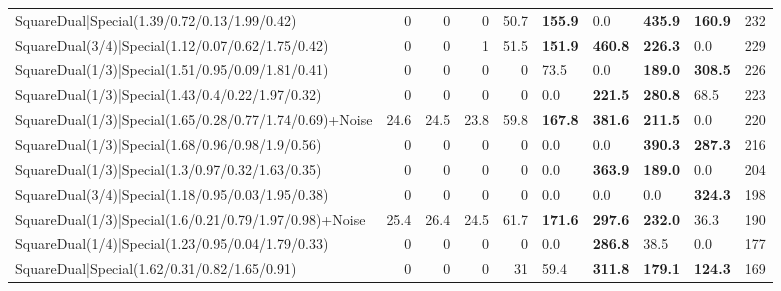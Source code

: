 \begin{tabular}{lrrrrllllr}
 SquareDual|Special(1.39/0.72/0.13/1.99/0.42)            &          0   &          0   &          0   &            50.7 & \textbf{155.9} & 0.0            & \textbf{435.9} & \textbf{160.9}  &          232 \\
 SquareDual(3/4)|Special(1.12/0.07/0.62/1.75/0.42)       &          0   &          0   &          1   &            51.5 & \textbf{151.9} & \textbf{460.8} & \textbf{226.3} & 0.0             &          229 \\
 SquareDual(1/3)|Special(1.51/0.95/0.09/1.81/0.41)       &          0   &          0   &          0   &             0   & 73.5           & 0.0            & \textbf{189.0} & \textbf{308.5}  &          226 \\
 SquareDual(1/3)|Special(1.43/0.4/0.22/1.97/0.32)        &          0   &          0   &          0   &             0   & 0.0            & \textbf{221.5} & \textbf{280.8} & 68.5            &          223 \\
 SquareDual(1/3)|Special(1.65/0.28/0.77/1.74/0.69)+Noise &         24.6 &         24.5 &         23.8 &            59.8 & \textbf{167.8} & \textbf{381.6} & \textbf{211.5} & 0.0             &          220 \\
 SquareDual(1/3)|Special(1.68/0.96/0.98/1.9/0.56)        &          0   &          0   &          0   &             0   & 0.0            & 0.0            & \textbf{390.3} & \textbf{287.3}  &          216 \\
 SquareDual(1/3)|Special(1.3/0.97/0.32/1.63/0.35)        &          0   &          0   &          0   &             0   & 0.0            & \textbf{363.9} & \textbf{189.0} & 0.0             &          204 \\
 SquareDual(3/4)|Special(1.18/0.95/0.03/1.95/0.38)       &          0   &          0   &          0   &             0   & 0.0            & 0.0            & 0.0            & \textbf{324.3}  &          198 \\
 SquareDual(1/3)|Special(1.6/0.21/0.79/1.97/0.98)+Noise  &         25.4 &         26.4 &         24.5 &            61.7 & \textbf{171.6} & \textbf{297.6} & \textbf{232.0} & 36.3            &          190 \\
 SquareDual(1/4)|Special(1.23/0.95/0.04/1.79/0.33)       &          0   &          0   &          0   &             0   & 0.0            & \textbf{286.8} & 38.5           & 0.0             &          177 \\
 SquareDual|Special(1.62/0.31/0.82/1.65/0.91)            &          0   &          0   &          0   &            31   & 59.4           & \textbf{311.8} & \textbf{179.1} & \textbf{124.3}  &          169 \\

\end{tabular}

